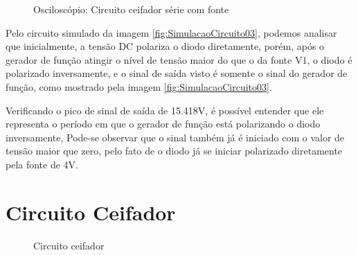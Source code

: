 \begin{figure}[H]
    \centering
    \caption{Osciloscópio: Circuito ceifador série com fonte}
    \vspace{-0.3cm}
    \label{fig:OsciloscopioCircuito03}
\end{figure}

Pelo circuito simulado da imagem \ref{fig:SimulacaoCircuito03}, podemos analisar que inicialmente, a tensão DC polariza o diodo diretamente, porém, após o gerador de função atingir o nível de tensão maior do que o da fonte V1, o diodo é polarizado inversamente, e o sinal de saída visto é somente o sinal do gerador de função, como mostrado pela imagem \ref{fig:SimulacaoCircuito03}. 

Verificando o pico de sinal de saída de 15.418V, é possível entender que ele representa o período em que o gerador de função está polarizando o diodo inversamente, Pode-se observar que o sinal também já é iniciado com o valor de tensão maior que zero, pelo fato de o diodo já se iniciar polarizado diretamente pela fonte de 4V.

\section{Circuito Ceifador}

\begin{figure}[H]
    \centering
    \caption{Circuito ceifador}
    \vspace{-0.3cm}
    \label{fig:ImagemSlide04}
\end{figure}


